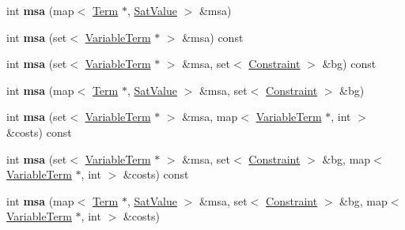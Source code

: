 \begin{DoxyCompactItemize}
\item 
\hypertarget{classConstraint_a70a760c53060ed4d6b3810f92164d42c}{int {\bfseries msa} (map$<$ \hyperlink{classTerm}{\-Term} $\ast$, \hyperlink{classSatValue}{\-Sat\-Value} $>$ \&msa)}\label{classConstraint_a70a760c53060ed4d6b3810f92164d42c}

\item 
\hypertarget{classConstraint_aa22f7e399260fded2bb0c4601b6f56ca}{int {\bfseries msa} (set$<$ \hyperlink{classVariableTerm}{\-Variable\-Term} $\ast$ $>$ \&msa) const }\label{classConstraint_aa22f7e399260fded2bb0c4601b6f56ca}

\item 
\hypertarget{classConstraint_a5a399e2e9b5fb661a529eac2a9bb44fb}{int {\bfseries msa} (set$<$ \hyperlink{classVariableTerm}{\-Variable\-Term} $\ast$ $>$ \&msa, set$<$ \hyperlink{classConstraint}{\-Constraint} $>$ \&bg) const }\label{classConstraint_a5a399e2e9b5fb661a529eac2a9bb44fb}

\item 
\hypertarget{classConstraint_a7a2c968ae20470063ad0267349194df9}{int {\bfseries msa} (map$<$ \hyperlink{classTerm}{\-Term} $\ast$, \hyperlink{classSatValue}{\-Sat\-Value} $>$ \&msa, set$<$ \hyperlink{classConstraint}{\-Constraint} $>$ \&bg)}\label{classConstraint_a7a2c968ae20470063ad0267349194df9}

\item 
\hypertarget{classConstraint_a2479161a01c443f4eb224b7fb7217362}{int {\bfseries msa} (set$<$ \hyperlink{classVariableTerm}{\-Variable\-Term} $\ast$ $>$ \&msa, map$<$ \hyperlink{classVariableTerm}{\-Variable\-Term} $\ast$, int $>$ \&costs) const }\label{classConstraint_a2479161a01c443f4eb224b7fb7217362}

\item 
\hypertarget{classConstraint_a7c474fbddf288ae4d434ad522e3f77d2}{int {\bfseries msa} (set$<$ \hyperlink{classVariableTerm}{\-Variable\-Term} $\ast$ $>$ \&msa, set$<$ \hyperlink{classConstraint}{\-Constraint} $>$ \&bg, map$<$ \hyperlink{classVariableTerm}{\-Variable\-Term} $\ast$, int $>$ \&costs) const }\label{classConstraint_a7c474fbddf288ae4d434ad522e3f77d2}

\item 
\hypertarget{classConstraint_a59bc13545b1cba70b4f019510d0dab30}{int {\bfseries msa} (map$<$ \hyperlink{classTerm}{\-Term} $\ast$, \hyperlink{classSatValue}{\-Sat\-Value} $>$ \&msa, set$<$ \hyperlink{classConstraint}{\-Constraint} $>$ \&bg, map$<$ \hyperlink{classVariableTerm}{\-Variable\-Term} $\ast$, int $>$ \&costs)}\label{classConstraint_a59bc13545b1cba70b4f019510d0dab30}


\end{DoxyCompactItemize}
